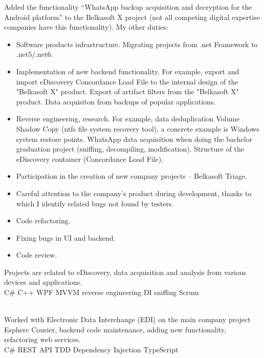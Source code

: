 \documentclass[
	a4paper,
]{fortysecondscv}
\begin{document}
\par
\makefrontsidebar{}

\begin{cvtable}[1.5]
    {
    Added the functionality “WhatsApp backup acquisition and decryption for the Android platform” to the Belkasoft X project (not all competing digital expertise companies have this functionality). My other duties:
    \begin{itemize}
        \item Software products infrastructure. Migrating projects from .net Framework to .net5/.net6.
        \item Implementation of new backend functionality. For example, export and import eDiscovery Concordance Load File to the internal design of the "Belkasoft X" product. Export of artifact filters from the "Belkasoft X" product. Data acquisiton from backups of popular applications.
        \item Reverse engineering, research. For example, data deduplication Volume Shadow Copy (ntfs file system recovery tool), a concrete example is Windows system restore points. WhatsApp data acquisition when doing the bachelor graduation project (sniffing, decompiling, modification). Structure of the eDiscovery container (Concordance Load File).
        \item Participation in the creation of new company projects -- Belkasoft Triage.
        \item Careful attention to the company's product during development, thanks to which I identify related bugs not found by testers.
        \item Code refactoring.
        \item Fixing bugs in UI and backend.
        \item Code review.
    \end{itemize}
    Projects are related to eDiscovery, data acquisition and analysis from various devices and applications.
    \\ \colorbox{cvsidecolor}{C\#}
    \colorbox{cvsidecolor}{C++}
    \colorbox{cvsidecolor}{WPF}
    \colorbox{cvsidecolor}{MVVM}
    \colorbox{cvsidecolor}{reverse engineering}
    \colorbox{cvsidecolor}{DI}
    \colorbox{cvsidecolor}{sniffing}
    \colorbox{cvsidecolor}{Scrum}
    }
    
    {\\
     Worked with Electronic Data Interchange (\colorbox{cvsidecolor}{EDI}) on the main company project Esphere Courier, backend code maintenance, adding new functionality, refactoring web services.
     \\ \colorbox{cvsidecolor}{C\#}
     \colorbox{cvsidecolor}{REST API}
     \colorbox{cvsidecolor}{TDD}
     \colorbox{cvsidecolor}{Dependency Injection}
     \colorbox{cvsidecolor}{TypeScript}
    }

\end{cvtable}
\end{document}
